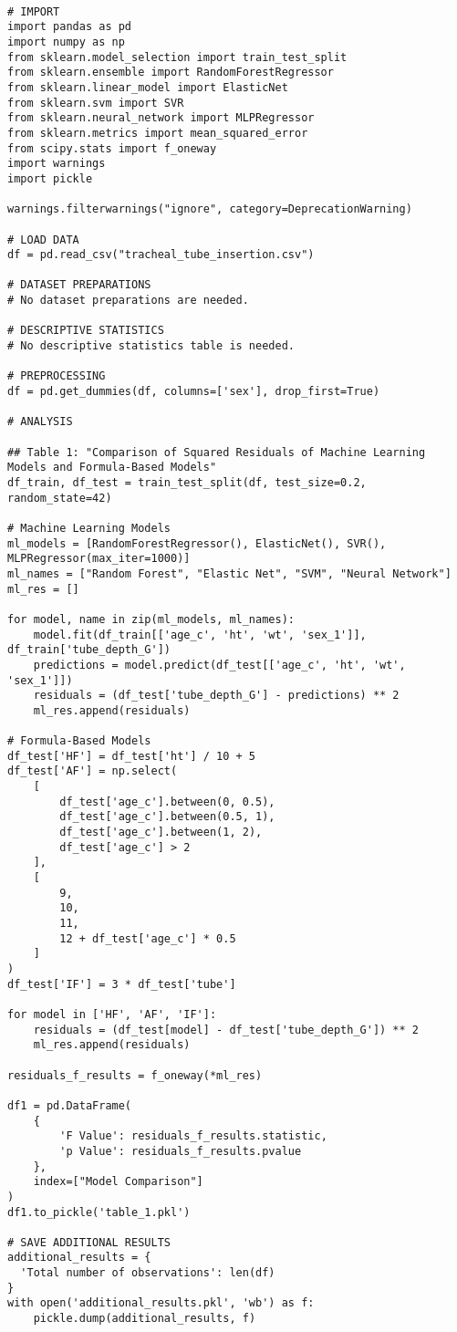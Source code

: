 \documentclass[11pt]{article}
\begin{document}
\begin{verbatim}

# IMPORT
import pandas as pd
import numpy as np
from sklearn.model_selection import train_test_split
from sklearn.ensemble import RandomForestRegressor
from sklearn.linear_model import ElasticNet
from sklearn.svm import SVR
from sklearn.neural_network import MLPRegressor
from sklearn.metrics import mean_squared_error
from scipy.stats import f_oneway
import warnings
import pickle

warnings.filterwarnings("ignore", category=DeprecationWarning)

# LOAD DATA
df = pd.read_csv("tracheal_tube_insertion.csv")

# DATASET PREPARATIONS
# No dataset preparations are needed.

# DESCRIPTIVE STATISTICS
# No descriptive statistics table is needed.

# PREPROCESSING
df = pd.get_dummies(df, columns=['sex'], drop_first=True)

# ANALYSIS

## Table 1: "Comparison of Squared Residuals of Machine Learning Models and Formula-Based Models"
df_train, df_test = train_test_split(df, test_size=0.2, random_state=42)

# Machine Learning Models
ml_models = [RandomForestRegressor(), ElasticNet(), SVR(), MLPRegressor(max_iter=1000)]
ml_names = ["Random Forest", "Elastic Net", "SVM", "Neural Network"]
ml_res = []

for model, name in zip(ml_models, ml_names):
    model.fit(df_train[['age_c', 'ht', 'wt', 'sex_1']], df_train['tube_depth_G'])
    predictions = model.predict(df_test[['age_c', 'ht', 'wt', 'sex_1']])
    residuals = (df_test['tube_depth_G'] - predictions) ** 2
    ml_res.append(residuals)

# Formula-Based Models
df_test['HF'] = df_test['ht'] / 10 + 5
df_test['AF'] = np.select(
    [
        df_test['age_c'].between(0, 0.5), 
        df_test['age_c'].between(0.5, 1), 
        df_test['age_c'].between(1, 2), 
        df_test['age_c'] > 2
    ], 
    [
        9, 
        10, 
        11, 
        12 + df_test['age_c'] * 0.5
    ]
)
df_test['IF'] = 3 * df_test['tube']

for model in ['HF', 'AF', 'IF']:
    residuals = (df_test[model] - df_test['tube_depth_G']) ** 2
    ml_res.append(residuals)

residuals_f_results = f_oneway(*ml_res)

df1 = pd.DataFrame(
    {
        'F Value': residuals_f_results.statistic, 
        'p Value': residuals_f_results.pvalue
    }, 
    index=["Model Comparison"]
)
df1.to_pickle('table_1.pkl')

# SAVE ADDITIONAL RESULTS
additional_results = {
  'Total number of observations': len(df)
}
with open('additional_results.pkl', 'wb') as f:
    pickle.dump(additional_results, f)

\end{verbatim}
\end{document}
